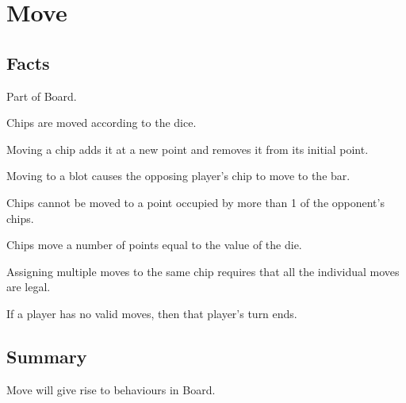 \section{Move}

\subsection{Facts}

\begin{dashed}
    \item Part of Board.
    \item Chips are moved according to the dice.
    \item Moving a chip adds it at a new point and removes it from its initial point.
    \item Moving to a blot causes the opposing player’s chip to move to the bar.
    \item Chips cannot be moved to a point occupied by more than 1 of the opponent's chips.
    \item Chips move a number of points equal to the value of the die.
    \item Assigning multiple moves to the same chip requires that all the individual moves are legal.
    \item If a player has no valid moves, then that player's turn ends.
\end{dashed}


\subsection{Summary}
Move will give rise to behaviours in Board.
